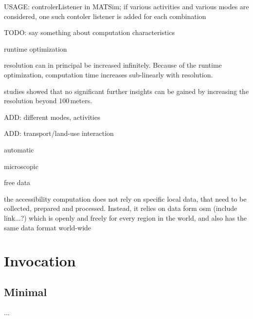 USAGE: controlerListener in MATSim; if various activities and various modes are considered, one such contoler listener is added for each combination


TODO: say something about computation characteristics

runtime optimization

resolution can in principal be increased infinitely. Because of the runtime optimization, computation time increases sub-linearly with resolution.

studies showed that no significant further insights can be gained by increasing the resolution beyond 100\,meters.

ADD: different modes, activities

ADD: transport/land-use interaction

automatic

microscopic

free data

the accessibility computation does not rely on specific local data, that need to be collected, prepared and processed. Instead, it relies on data form \gls{osm} (include link...?) which is openly and freely for every region in the world, and also has the same data format world-wide










\section{Invocation}

\subsection{Minimal}

...




